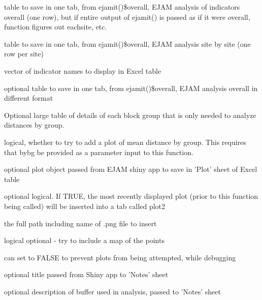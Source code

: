 \documentclass[a4paper]{book}
\begin{document}
\begin{Arguments}
\begin{ldescription}
\item[\code{overall}] table to save in one tab, from ejamit()\$overall, EJAM analysis of indicators overall (one row),
but if entire output of ejamit() is passed as if it were overall, function figures out eachsite, etc.

\item[\code{eachsite}] table to save in one tab, from ejamit()\$overall, EJAM analysis site by site (one row per site)

\item[\code{longnames}] vector of indicator names to display in Excel table

\item[\code{formatted}] optional table to save in one tab, from ejamit()\$overall, EJAM analysis overall in different format

\item[\code{bybg}] Optional large table of details of each block group that is only needed to analyze distances by group.

\item[\code{plot\_distance\_by\_group}] logical, whether to try to add a plot of mean distance by group.
This requires that bybg be provided as a parameter input to this function.

\item[\code{summary\_plot}] optional plot object passed from EJAM shiny app to save in 'Plot' sheet of Excel table

\item[\code{plotlatest}] optional logical. If TRUE, the most recently displayed plot (prior to this function being called) will be inserted into a tab called plot2

\item[\code{plotfilename}] the full path including name of .png file to insert

\item[\code{mapadd}] logical optional - try to include a map of the points

\item[\code{ok2plot}] can set to FALSE to prevent plots from being attempted, while debugging

\item[\code{analysis\_title}] optional title passed from Shiny app to 'Notes' sheet

\item[\code{buffer\_desc}] optional description of buffer used in analysis, passed to 'Notes' sheet


\end{ldescription}
\end{Arguments}
\end{document}
